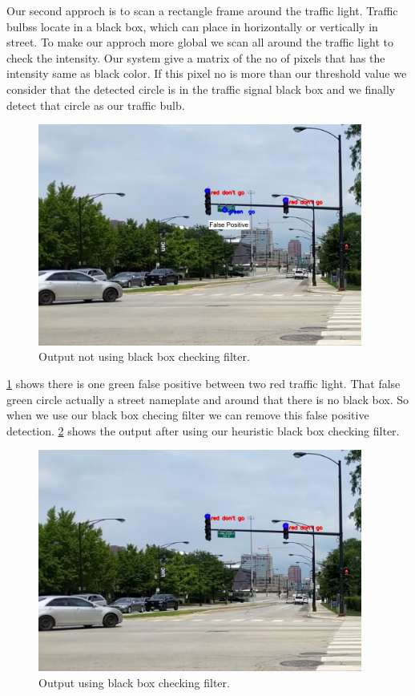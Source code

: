Our second approch is to scan a rectangle frame  around the traffic light.
Traffic bulbss locate in a black box, which can place in horizontally or vertically in street.
To make our approch more global we scan all around the traffic light to check the intensity.
Our system give a matrix of the no of pixels that has the intensity same as black color.
If this pixel no is more than our threshold value we consider that the detected circle is in the traffic signal black box and we finally detect that circle as our traffic bulb.
\begin{figure}[!ht]
\centering
\includegraphics[width=4.2in]{images/norec_filter.pdf}
\caption{Output not using black box checking filter.}
\label{f:norec_filter}
\end{figure}

\ref{f:norec_filter} shows there is one green false positive between two red traffic light.
That false green circle actually a street nameplate and around that there is no black box.
So when we use our black box checing filter we can remove this false positive detection.
\ref{f:rec_filter} shows the output after using our heuristic black box checking filter.




\begin{figure}[ht!]
\centering
\includegraphics[width=4.2in]{images/rec_filter.pdf}
\caption{Output using black box checking filter.}
\label{f:rec_filter}
\end{figure}


